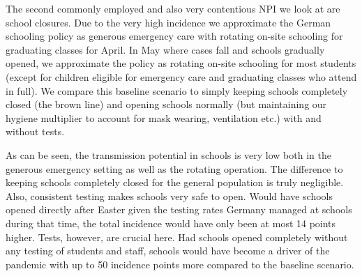\FloatBarrier

The second commonly employed and also very contentious NPI we look at are school
closures. Due to the very high incidence we approximate the German schooling policy as
generous emergency care with rotating on-site schooling for graduating classes for April.
In May where cases fall and schools gradually opened, we approximate the policy as
rotating on-site schooling for most students (except for children eligible for emergency
care and graduating classes who attend in full). We compare this baseline scenario to
simply keeping schools completely closed (the brown line) and opening schools normally
(but maintaining our hygiene multiplier to account for mask wearing, ventilation etc.)
with and without tests.

As can be seen, the transmission potential in schools is very low both in the generous
emergency setting as well as the rotating operation. The difference to keeping schools
completely closed for the general population is truly negligible. Also, consistent
testing makes schools very safe to open. Would have schools opened directly after Easter
given the testing rates Germany managed at schools during that time, the total incidence
would have only been at most 14 points higher. Tests, however, are crucial here. Had
schools opened completely without any testing of students and staff, schools would have
become a driver of the pandemic with up to 50 incidence points more compared to the
baseline scenario.

